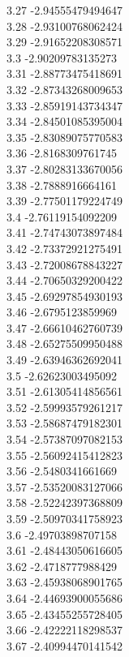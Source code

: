 {3.27	-2.94555479494647\\
3.28	-2.93100768062424\\
3.29	-2.91652208308571\\
3.3	-2.90209783135273\\
3.31	-2.88773475418691\\
3.32	-2.87343268009653\\
3.33	-2.85919143734347\\
3.34	-2.84501085395004\\
3.35	-2.83089075770583\\
3.36	-2.8168309761745\\
3.37	-2.80283133670056\\
3.38	-2.7888916664161\\
3.39	-2.77501179224749\\
3.4	-2.76119154092209\\
3.41	-2.74743073897484\\
3.42	-2.73372921275491\\
3.43	-2.72008678843227\\
3.44	-2.70650329200422\\
3.45	-2.69297854930193\\
3.46	-2.6795123859969\\
3.47	-2.66610462760739\\
3.48	-2.65275509950488\\
3.49	-2.63946362692041\\
3.5	-2.62623003495092\\
3.51	-2.61305414856561\\
3.52	-2.59993579261217\\
3.53	-2.58687479182301\\
3.54	-2.57387097082153\\
3.55	-2.56092415412823\\
3.56	-2.5480341661669\\
3.57	-2.53520083127066\\
3.58	-2.52242397368809\\
3.59	-2.50970341758923\\
3.6	-2.49703898707158\\
3.61	-2.48443050616605\\
3.62	-2.4718777988429\\
3.63	-2.45938068901765\\
3.64	-2.44693900055686\\
3.65	-2.43455255728405\\
3.66	-2.42222118298537\\
3.67	-2.40994470141542\\
}
